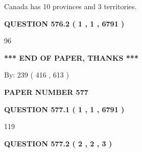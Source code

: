 \documentclass[12pt]{article}
\begin{document}
 
Canada has 10  provinces and 3 territories.
 
 
 
 
  
\vspace{0.2in}
  
{\textbf{\Large{QUESTION
576.2 
 ( 1 , 1 , 6791 )
}}}
  
  
 
 
\noindent{}

96
 
 
   
   
 \vspace{0.2in}
 
   
   
   
   
\vspace{1.0in} 
{\textbf{\large{ *** END OF PAPER, THANKS *** }}} 
   
   
\hspace{1.0in} By: 
 239 ( 416 ,  613 )
   
   
   
   
\newpage 
\setcounter{page}{ 
   577001 } 
   
   
   
   
 {\textbf{ \Large{ PAPER NUMBER  577  }}}
   
   
\vspace{0.2in}
   
   
   
   
   
   
 \vspace{0.2in}
 
 
 
 
   
   
  
\vspace{0.2in}
  
{\textbf{\Large{QUESTION
577.1 
 ( 1 , 1 , 6791 )
}}}
  
  
 
 
\noindent{}

119
 
 
  
\vspace{0.2in}
  
{\textbf{\Large{QUESTION
577.2 
 ( 2 , 2 , 3 )
}}}
  
\end{document}

